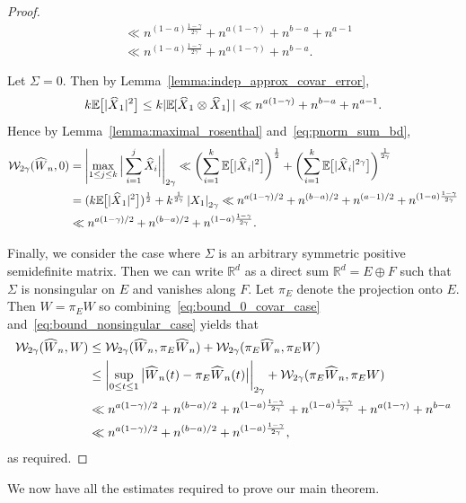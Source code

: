 \documentclass[11pt,a4paper,reqno,oneside]{amsart}
\newcommand{\R}{\ensuremath{\mathbb{R}}}%
\newcommand{\pnorm}[1]{\left|#1\right|}
\newcommand{\Ex}[2][]{\mathbb{E}_{#1\!\!}\left[#2\right]}
\newcommand{\wass}{\mathcal{W}}
\newcommand{\shat}[1]{\vphantom{#1}\smash[t]{\widehat{#1}}}
\theoremstyle{definition}
\theoremstyle{remark}
\numberwithin{equation}{section}
\begin{document}
\begin{proof}
\begin{align}
		&\ll n^{(1-a)\frac{1-\gamma}{2\gamma}}+n^{a(1-\gamma)}+n^{b-a}+n^{a-1}\nonumber\\
		&\ll n^{(1-a)\frac{1-\gamma}{2\gamma}}+n^{a(1-\gamma)}+n^{b-a}.\label{eq:bound_nonsingular_case}
	\end{align}
	\par Let $\Sigma=0$. Then by Lemma~\ref{lemma:indep_approx_covar_error}, \[k\Ex{|\shat{X}_1|^2}\le k|\Ex{\shat{X}_1\otimes \shat{X}_1}|\ll n^{a(1-\gamma)}+n^{b-a}+n^{a-1}.\]
	Hence by Lemma~\ref{lemma:maximal_rosenthal} and~\eqref{eq:pnorm_sum_bd},
	\begin{align}\label{eq:bound_0_covar_case}
		\wass_{2\gamma}(\shat{W}_n,0)&=\pnorm{\max_{1\le j\le k}\Big|\sum_{i=1}^{j} \widehat{X}_i\Big|}_{2\gamma}\ll \biggl(\sum_{i=1}^{k} \Ex{|\shat{X}_i|^2}\biggr)^{\frac{1}{2}}+ \biggl(\sum_{i=1}^{k} \Ex{|\shat{X}_i|^{2\gamma}}\biggr)^{\frac{1}{2\gamma}} \nonumber\\
		&= (k\Ex{|\shat{X}_1|^2})^{\frac{1}{2}}+k^{\frac{1}{2\gamma}}\pnorm{X_1}_{2\gamma}
		\ll n^{a(1-\gamma)/2} + n^{(b-a)/2} + n^{(a-1)/2}+n^{(1-a)\frac{1-\gamma}{2\gamma}}\nonumber\\
		&\ll n^{a(1-\gamma)/2} + n^{(b-a)/2} +n^{(1-a)\frac{1-\gamma}{2\gamma}}.
	\end{align}
	
	Finally, we consider the case where $\Sigma$ is an arbitrary symmetric positive semidefinite matrix. 
	Then we can write $\R^d$ as a direct sum $\R^d = E\oplus F$ such that $\Sigma$ is nonsingular on $E$ and vanishes along $F$. Let $\pi_E$ denote the projection onto $E$. Then $W = \pi_E W$ so combining~\eqref{eq:bound_0_covar_case} and~\eqref{eq:bound_nonsingular_case} yields that
	\begin{align*}
		\wass_{2\gamma}(\shat{W}_n,W)&\le \wass_{2\gamma}(\shat{W}_n, \pi_E \shat{W}_n) + \wass_{2\gamma}(\pi_E \shat{W}_n,\pi_E W)\\
		&\le \pnorm{\sup_{0\le t\le 1}\big|\shat{W}_n(t)-\pi_E \shat{W}_n(t)\big|}_{2\gamma}+\wass_{2\gamma}(\pi_E \shat{W}_n,\pi_E W)\\
		&\ll n^{a(1-\gamma)/2} + n^{(b-a)/2} + n^{(1-a)\frac{1-\gamma}{2\gamma}}+n^{(1-a)\frac{1-\gamma}{2\gamma}}+n^{a(1-\gamma)}+n^{b-a}\\
		&\ll n^{a(1-\gamma)/2}+ n^{(b-a)/2}+n^{(1-a)\frac{1-\gamma}{2\gamma}},
	\end{align*}
	as required.
\end{proof}
	We now have all the estimates required to prove our main theorem.
\end{document}
